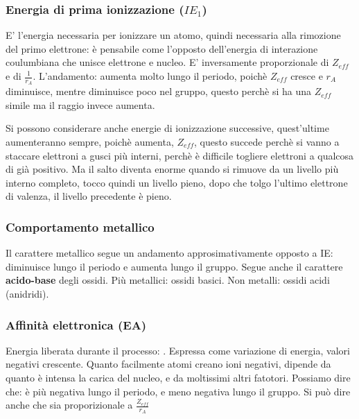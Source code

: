 \subsubsection{Energia di prima ionizzazione ($IE_1$)}
E' l'energia necessaria per ionizzare un atomo, quindi necessaria alla rimozione del primo elettrone: è pensabile come l'opposto dell'energia di interazione coulumbiana che unisce elettrone e nucleo. E' inversamente proporzionale di $Z_{eff}$ e di $\frac{1}{r_A}$. L'andamento: aumenta molto lungo il periodo, poichè $Z_{eff}$ cresce e $r_A$ diminuisce, mentre diminuisce poco nel gruppo, questo perchè si ha una $Z_{eff}$ simile ma il raggio invece aumenta. 


Si possono considerare anche energie di ionizzazione successive, quest'ultime aumenteranno sempre, poichè aumenta, $Z_{eff}$, questo succede perchè si vanno a staccare elettroni a gusci più interni, perchè è difficile togliere elettroni a qualcosa di già positivo. Ma il salto diventa enorme quando si rimuove da un livello più interno completo, tocco quindi un livello pieno, dopo che tolgo l'ultimo elettrone di valenza, il livello precedente è pieno. 

\subsubsection{Comportamento metallico}
Il carattere metallico segue un andamento approsimativamente opposto a IE: diminuisce lungo il periodo e aumenta lungo il gruppo. Segue anche il carattere \textbf{acido-base} degli ossidi. Più metallici: ossidi basici. Non metalli: ossidi acidi (anidridi).

\subsubsection{Affinità elettronica (EA)}
Energia liberata durante il processo: . Espressa come variazione di energia, valori negativi crescente. Quanto facilmente atomi creano ioni negativi, dipende da quanto è intensa la carica del nucleo, e da moltissimi altri fatotori. Possiamo dire che: è più negativa lungo il periodo, e meno negativa lungo il gruppo. Si può dire anche che sia proporizionale a $\frac{Z_{eff}}{r_A}$ 

